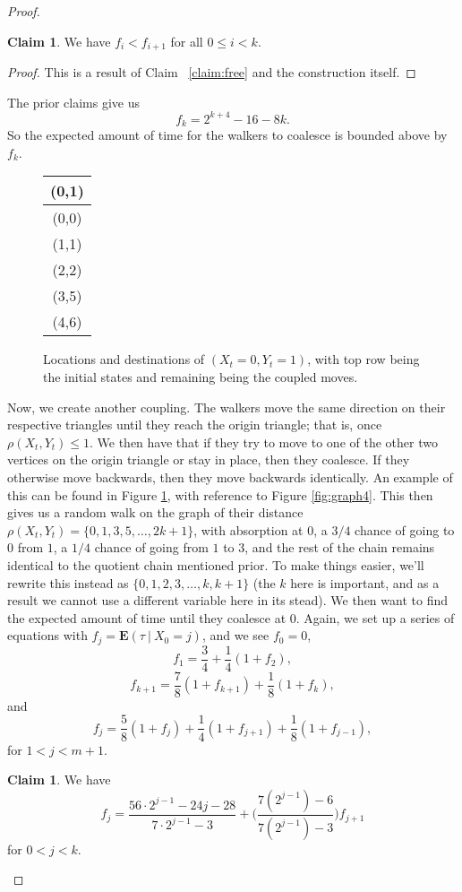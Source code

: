 \documentclass[10pt,a4paper]{amsart}
\theoremstyle{definition}
\numberwithin{definition}{section}
\newtheorem{claim}[definition]{Claim}
\begin{document}
\begin{proof}
\begin{claim}
We have $f_i < f_{i+1}$ for all $0 \leq i < k$.
\end{claim}

\begin{proof}
This is a result of Claim ~\ref{claim:free} and the construction itself.
\end{proof}

The prior claims give us
\[f_k = 2^{k+4} - 16 - 8k. \]
So the expected amount of time for the walkers to coalesce is bounded above by $f_k$.

\begin{figure}

\begin{center}
 \begin{tabular}{| c ||} 
 \hline
 (0,1)\\  
 \hline\hline
 (0,0) \\
 \hline
 (1,1) \\ 
 \hline
 (2,2)\\
 \hline
 (3,5) \\
  
 \hline
 (4,6)\\ 

 \hline
\end{tabular}
\end{center}
\caption{Locations and destinations of $(X_t = 0, Y_t = 1)$, with top row being the initial states and remaining being the coupled moves.}
\label{tb:move2}
\end{figure}

Now, we create another coupling. The walkers move the same direction on their respective triangles until they reach the origin triangle; that is, once $\rho(X_t, Y_t) \leq 1$. We then have that if they try to move to one of the other two vertices on the origin triangle or stay in place, then they coalesce. If they otherwise move backwards, then they move backwards identically. An example of this can be found in Figure \ref{tb:move2}, with reference to Figure \ref{fig:graph4}. This then gives us a random walk on the graph of their distance $\rho(X_t, Y_t) = \{0,1,3,5,\ldots, 2k+1\}$, with absorption at $0$, a $3/4$ chance of going to $0$ from $1$, a $1/4$ chance of going from $1$ to $3$, and the rest of the chain remains identical to the quotient chain mentioned prior. To make things easier, we'll rewrite this instead as $\{0,1,2,3,\ldots,k,k+1\}$ (the $k$ here is important, and as a result we cannot use a different variable here in its stead). We then want to find the expected amount of time until they coalesce at $0$. Again, we set up a series of equations with $f_j = \mathbf{E}(\tau \ | \ X_0 = j)$, and we see $f_0 = 0$, 
\[f_1 = \frac{3}{4} + \frac{1}{4}(1 + f_2), \]
\[f_{k+1} = \frac{7}{8}(1+f_{k+1}) + \frac{1}{8}(1+f_{k}), \]
and
\[f_j = \frac{5}{8}(1 + f_j) + \frac{1}{4}(1+f_{j+1}) + \frac{1}{8}(1+f_{j-1}), \]
for $1 < j < m+1$. 
\begin{claim}\label{claim:jund}
We have
\[ f_j = \frac{56 \cdot 2^{j-1}-24j-28}{7 \cdot 2^{j-1}-3} + \bigg(\frac{7(2^{j-1})-6}{7(2^{j-1})-3}\bigg) f_{j+1}\]
for $0 < j < k$.
\end{claim}


\end{proof}
\end{document}
